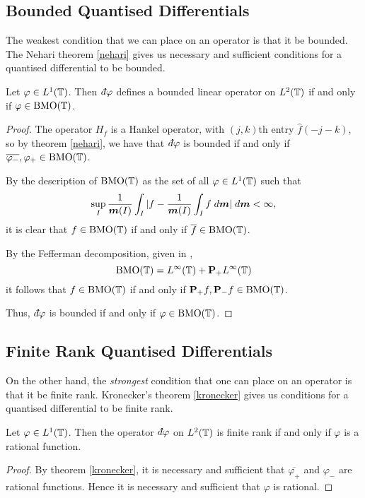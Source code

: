 \subsection{Bounded Quantised Differentials}
The weakest condition that we can place on an operator is that it be bounded.
The Nehari theorem \ref{nehari} gives us necessary and sufficient conditions
for a quantised differential to be bounded.
\begin{proposition}
    Let $\varphi \in L^1(\mathbb{T})$. Then $\qd \varphi$ defines a bounded
    linear operator on $L^2(\mathbb{T})$ if and only if $\varphi \in \operatorname{BMO}(\mathbb{T})$.
\end{proposition}
\begin{proof}
    The operator $H_{f}$ is a Hankel operator, with $(j,k)$th entry $\hat{f}(-j-k)$,
    so by theorem \ref{nehari}, we have that $\qd \varphi$ is bounded
    if and only if $\overline{\varphi_-},\varphi_+ \in \operatorname{BMO}(\mathbb{T})$. 
    
    By the description of $\operatorname{BMO}(\mathbb{T})$ as the set of all $\varphi \in L^1(\mathbb{T})$
    such that
    \begin{equation}
        \sup_{I} \frac{1}{\boldsymbol{m}(I)} \int_{I} |f-\frac{1}{\boldsymbol{m}(I)}\int_I f\;d\boldsymbol{m}| \;d\boldsymbol{m} < \infty,
    \end{equation}
    it is clear that $f \in \operatorname{BMO}(\mathbb{T})$ if and only if $\overline{f} \in \operatorname{BMO}(\mathbb{T})$.
    
    By the Fefferman decomposition, given in \cite{Garnett},
    \begin{equation}
        \operatorname{BMO}(\mathbb{T}) = L^\infty(\mathbb{T})+\mathbf{P}_+L^\infty(\mathbb{T})
    \end{equation}
    it follows that $f \in \operatorname{BMO}(\mathbb{T})$ if and only if $\mathbf{P}_+f,\mathbf{P}_-f \in \operatorname{BMO}(\mathbb{T})$.
    
    Thus, $\qd \varphi$ is bounded if and only if $\varphi \in \operatorname{BMO}(\mathbb{T})$.
\end{proof}



\subsection{Finite Rank Quantised Differentials}
On the other hand, the \emph{strongest} condition that one
can place on an operator is that it be finite rank. Kronecker's theorem \ref{kronecker}
gives us conditions for a quantised differential to be finite rank.
\begin{proposition}
    Let $\varphi \in L^1(\mathbb{T})$. Then the operator $\qd \varphi$
    on $L^2(\mathbb{T})$ is finite rank if and only if $\varphi$
    is a rational function.
\end{proposition}
\begin{proof}
    By theorem \ref{kronecker}, it is necessary and sufficient
    that $\overline{\varphi_+}$ and $\varphi_-$ are rational
    functions. Hence it is necessary and sufficient that $\varphi$
    is rational.
\end{proof}

